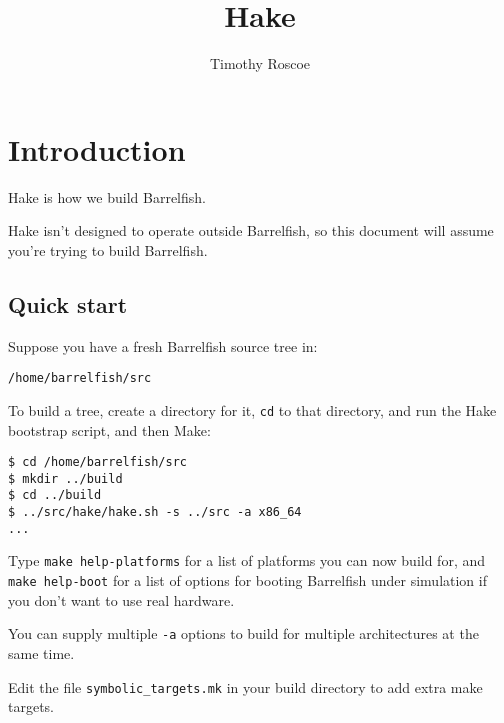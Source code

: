 \documentclass[a4paper,twoside]{report} %
\title{Hake}   %
\author{Timothy Roscoe}	%
\begin{document}
\maketitle

%
%
\begin{versionhistory}
\end{versionhistory}

\tableofcontents		%

\chapter{Introduction}

Hake is how we build Barrelfish. 

Hake isn't designed to operate outside Barrelfish, so this document
will assume you're trying to build Barrelfish. 

\section{Quick start}

Suppose you have a fresh Barrelfish source tree in:

\texttt{/home/barrelfish/src}

To build a tree, create a directory for it, \texttt{cd} to that
directory, and run the Hake bootstrap script, and then Make:

\begin{verbatim}
$ cd /home/barrelfish/src
$ mkdir ../build
$ cd ../build
$ ../src/hake/hake.sh -s ../src -a x86_64
...
\end{verbatim}

Type \texttt{make help-platforms} for a list of platforms you can now
build for, and \texttt{make help-boot} for a list of options for
booting Barrelfish under simulation if you don't want to use real
hardware. 

You can supply multiple \texttt{-a} options to build for multiple
architectures at the same time. 

Edit the file \texttt{symbolic\_targets.mk} in your build directory to
add extra make targets. 
\end{document}
